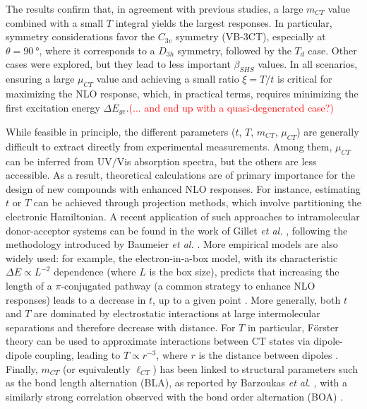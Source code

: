 \documentclass[USenglish]{article}
\begin{document}
The results confirm that, in agreement with previous studies, a large $m_{CT}$ value combined with a small $T$ integral yields the largest responses. In particular, symmetry considerations favor the $C_{3v}$ symmetry (VB-3CT), especially at $\theta = \SI{90}{\degree}$, where it corresponds to a $D_{3h}$ symmetry, followed by the $T_d$ case. Other cases were explored, but they lead to less important $\beta_{SHS}$ values.
In all scenarios, ensuring a large $\mu_{CT}$ value and achieving a small ratio $\xi = T/t$ is critical for maximizing the NLO response, which, in practical terms, requires minimizing the first excitation energy $\Delta E_{ge}$.\textcolor{red}{(... and end up with a quasi-degenerated case?)}

While feasible in principle, the different parameters ($t$, $T$, $m_{CT}$, $\mu_{CT}$) are generally difficult to extract directly from experimental measurements. Among them, $\mu_{CT}$ can be inferred from UV/Vis absorption spectra, but the others are less accessible. As a result, theoretical calculations are of primary importance for the design of new compounds with enhanced NLO responses.
For instance, estimating $t$ or $T$ can be achieved through projection methods, which involve partitioning the electronic Hamiltonian. A recent application of such approaches to intramolecular donor-acceptor systems can be found in the work of Gillet \emph{et al.} \cite{gilletElectronicCouplingCalculations2016}, following the methodology introduced by Baumeier \emph{et al.} \cite{baumeierDensityfunctionalBasedDetermination2010}. More empirical models are also widely used: for example, the electron-in-a-box model, with its characteristic $\Delta E \propto L^{-2}$ dependence (where $L$ is the box size), predicts that increasing the length of a $\pi$-conjugated pathway (a common strategy to enhance NLO responses) leads to a decrease in $t$, up to a given point \cite{luValenceBondChargeTransferModel1994}.
More generally, both $t$ and $T$ are dominated by electrostatic interactions at large intermolecular separations and therefore decrease with distance. For $T$ in particular, Förster theory can be used to approximate interactions between CT states via dipole-dipole coupling, leading to $T \propto r^{-3}$, where $r$ is the distance between dipoles \cite{sistoInitioNonadiabaticDynamics2014}.
Finally, $m_{CT}$ (or equivalently $\ell_{CT}$) has been linked to structural parameters such as the bond length alternation (BLA), as reported by Barzoukas \emph{et al.} \cite{barzoukasTWOFORMDESCRIPTIONPUSHPULL1996,barzoukasTwostateDescriptionHyper1996}, with a similarly strong correlation observed with the bond order alternation (BOA) \cite{dellaiDynamicEffectsNonlinear2024}.
\end{document}
